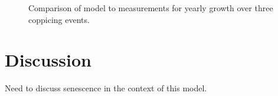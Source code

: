\documentclass[10pt]{article}
\begin{document}
\begin{figure}[!ht]
  \centering
  
  \caption{Comparison of model to measurements for yearly growth over three
    coppicing events.}
\label{fig:afas-biomass}
\end{figure}

\section*{Discussion}

Need to discuss senescence in the context of this model.





\end{document}
